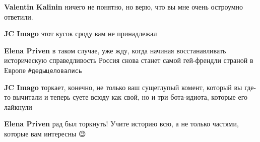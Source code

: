 \begin{itemize}
\begin{itemize}
 
\textbf{Valentin Kalinin} ничего не понятно, но верю, что вы мне очень остроумно ответили.

 
\textbf{JC Imago} этот кусок сроду вам не принадлежал

 
\textbf{Elena Priven} в таком случае, уже жду, когда начиная восстанавливать историческую справедливость Россия снова станет самой гей-френдли страной в Европе \Smiley[1.0][yellow] \verb|#дедыцеловались|

 
\textbf{JC Imago} торкает, конечно, не только ваш сущеглупый комент, который вы где-то вычитали и теперь суете всюду как свой, но и три бота-идиота, которые его лайкнули

 
\textbf{Elena Priven} рад был торкнуть! Учите историю всю, а не только частями, которые вам интересны 😉
\end{itemize}

 

\end{itemize}

